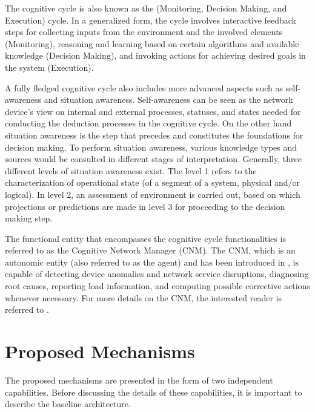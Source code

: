 \documentclass[journal]{IEEEtran}
\begin{document}
The cognitive cycle is also known as the  (Monitoring, Decision Making, and Execution) cycle. In a generalized form, the  cycle involves interactive feedback steps for collecting inputs from the environment and the involved elements (Monitoring), reasoning and learning based on certain algorithms and available knowledge (Decision Making), and invoking actions for achieving desired goals in the system (Execution).

A fully fledged cognitive cycle also includes more advanced aspects such as self-awareness and situation awareness. Self-awareness can be seen as the network device's view on internal and external processes, statuses, and states needed for conducting the deduction processes in the cognitive cycle. On the other hand situation awareness is the step that precedes and constitutes the foundations for decision making. To perform situation awareness, various knowledge types and sources would be consulted in different stages of interpretation. Generally, three different levels of situation awareness exist. The level 1 refers to the characterization of operational state (of a segment of a system, physical and/or logical). In level 2, an assessment of environment is carried out, based on which projections or predictions are made in level 3 for proceeding to the decision making step. 


The functional entity that encompasses the cognitive cycle functionalities is referred to as the Cognitive Network Manager (CNM). The CNM, which is an autonomic entity (also referred to as the agent) and has been introduced in \cite{cognition,agent}, is capable of detecting device anomalies and network service disruptions, diagnosing root causes, reporting load information, and computing possible corrective actions whenever necessary. For more details on the CNM, the interested reader is referred to \cite{cognition}.













\section{Proposed Mechanisms}
The proposed mechanisms are presented in the form of two independent capabilities. Before discussing the details of these capabilities, it is important to describe the baseline architecture.
\end{document}
